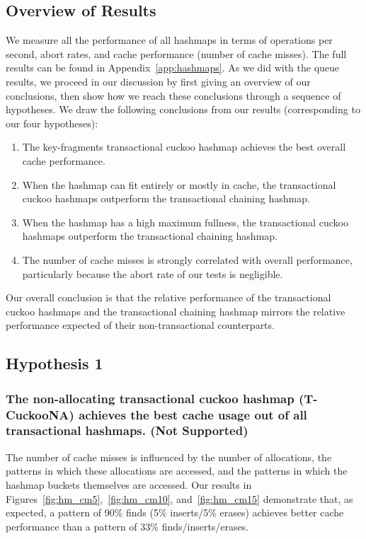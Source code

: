 \subsection{Overview of Results}

We measure all the performance of all hashmaps in terms of operations per second, abort rates, and cache performance (number of cache misses). 
The full results can be found in Appendix~\ref{app:hashmaps}. As we did with the queue results, we proceed in our discussion by first giving an overview of our conclusions, then show how we reach these conclusions through a sequence of hypotheses. We draw the following conclusions from our results (corresponding to our four hypotheses):
\begin{enumerate}
    \item The key-fragments transactional cuckoo hashmap achieves the best overall cache performance. 
    \item When the hashmap can fit entirely or mostly in cache, the transactional cuckoo hashmaps outperform the transactional chaining hashmap.
    \item When the hashmap has a high maximum fullness, the transactional cuckoo hashmaps outperform the transactional chaining hashmap.
    \item The number of cache misses is strongly correlated with overall performance, particularly because the abort rate of our tests is negligible.
\end{enumerate}
Our overall conclusion is that the relative performance of the transactional cuckoo hashmaps and the transactional chaining hashmap mirrors the relative performance expected of their non-transactional counterparts.

\subsection{Hypothesis 1}
\subsubsection{The non-allocating transactional cuckoo hashmap (T-CuckooNA) achieves the best cache usage out of all transactional hashmaps. (Not Supported)}
\label{section:hmcm}

The number of cache misses is influenced by the number of allocations, the patterns in which these allocations are accessed, and the patterns in which the hashmap buckets themselves are accessed. Our results in Figures~\ref{fig:hm_cm5},~\ref{fig:hm_cm10}, and~\ref{fig:hm_cm15} demonstrate that, as expected, a pattern of 90\% finds (5\% inserts/5\% erases) achieves better cache performance than a pattern of 33\% finds/inserts/erases.

